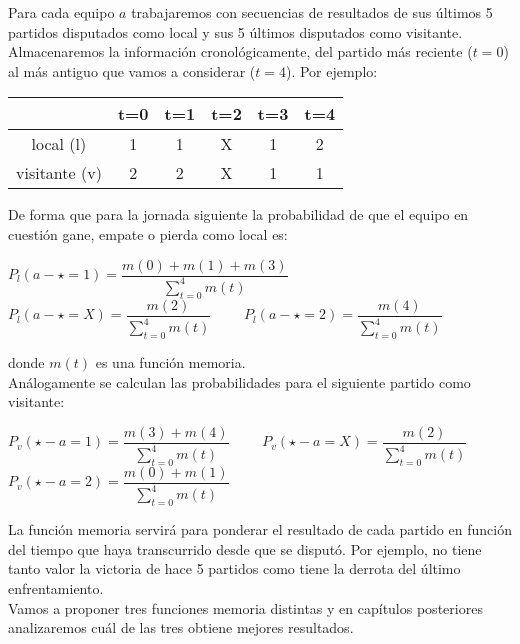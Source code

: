 Para cada equipo $a$ trabajaremos con secuencias de resultados de sus últimos 5 partidos disputados como local y sus 5 últimos disputados como visitante. Almacenaremos la información cronológicamente, del partido más reciente ($t=0$) al más antiguo que vamos a considerar ($t=4$). Por ejemplo:
\begin{center}
	\begin{tabular}{|c|c|c|c|c|c|}
	\hline  & t=0 & t=1 & t=2 & t=3 & t=4 \\ 
	\hline local (l)  & 1 & 1 & X & 1 & 2\\ 
	\hline visitante (v) & 2 & 2 & X & 1 & 1\\ 
	\hline 
	\end{tabular} 
\end{center}
De forma que para la jornada siguiente la probabilidad de que el equipo en cuestión gane, empate o pierda como local es:
\begin{center}
$P_{l}(a - \star=1)=\dfrac{m(0)+m(1)+m(3)}{\sum_{t=0}^{4}m(t)}$\\
$P_{l}(a - \star=X)=\dfrac{m(2)}{\sum_{t=0}^{4}m(t)}$ \ \ \ \
$P_{l}(a - \star=2)=\dfrac{m(4)}{\sum_{t=0}^{4}m(t)}$
\end{center}
donde $m(t)$ es una función memoria.\\

Análogamente se calculan las probabilidades para el siguiente partido como visitante:
\begin{center}
	$P_{v}(\star - a=1)=\dfrac{m(3)+m(4)}{\sum_{t=0}^{4}m(t)}$ \ \ \ \
	$P_{v}(\star - a=X)=\dfrac{m(2)}{\sum_{t=0}^{4}m(t)}$\\
	$P_{v}(\star - a=2)=\dfrac{m(0)+m(1)}{\sum_{t=0}^{4}m(t)}$
\end{center}

La función memoria servirá para ponderar el resultado de cada partido en función del tiempo que haya transcurrido desde que se disputó. Por ejemplo, no tiene tanto valor la victoria de hace 5 partidos como tiene la derrota del último enfrentamiento.\\

Vamos a proponer tres funciones memoria distintas y en capítulos posteriores analizaremos cuál de las tres obtiene mejores resultados. 

\newpage

